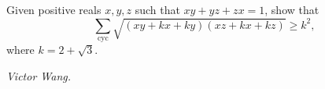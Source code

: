 Given positive reals $x,y,z$ such that $xy+yz+zx=1$, show that
\[\sum_{\text{cyc}}\sqrt{(xy+kx+ky)(xz+kx+kz)}\ge k^2,\]where $k=2+\sqrt{3}$.

\textit{Victor Wang.}